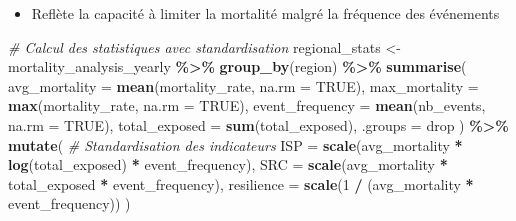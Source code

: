 \documentclass[
]{article}
\newenvironment{Shaded}{\begin{snugshade}}{\end{snugshade}}
\newcommand{\AttributeTok}[1]{\textcolor[rgb]{0.13,0.29,0.53}{#1}}
\newcommand{\CommentTok}[1]{\textcolor[rgb]{0.56,0.35,0.01}{\textit{#1}}}
\newcommand{\ConstantTok}[1]{\textcolor[rgb]{0.56,0.35,0.01}{#1}}
\newcommand{\DecValTok}[1]{\textcolor[rgb]{0.00,0.00,0.81}{#1}}
\newcommand{\FunctionTok}[1]{\textcolor[rgb]{0.13,0.29,0.53}{\textbf{#1}}}
\newcommand{\NormalTok}[1]{#1}
\newcommand{\OtherTok}[1]{\textcolor[rgb]{0.56,0.35,0.01}{#1}}
\newcommand{\SpecialCharTok}[1]{\textcolor[rgb]{0.81,0.36,0.00}{\textbf{#1}}}
\newcommand{\StringTok}[1]{\textcolor[rgb]{0.31,0.60,0.02}{#1}}
\providecommand{\tightlist}{%
  \setlength{\itemsep}{0pt}\setlength{\parskip}{0pt}}
\begin{document}
\begin{itemize}
\tightlist
\item
  Reflète la capacité à limiter la mortalité malgré la fréquence des
  événements
\end{itemize}

\begin{Shaded}
\begin{Highlighting}[]
\CommentTok{\# Calcul des statistiques avec standardisation}
\NormalTok{regional\_stats }\OtherTok{\textless{}{-}}\NormalTok{ mortality\_analysis\_yearly }\SpecialCharTok{\%\textgreater{}\%}
  \FunctionTok{group\_by}\NormalTok{(region) }\SpecialCharTok{\%\textgreater{}\%}
  \FunctionTok{summarise}\NormalTok{(}
    \AttributeTok{avg\_mortality =} \FunctionTok{mean}\NormalTok{(mortality\_rate, }\AttributeTok{na.rm =} \ConstantTok{TRUE}\NormalTok{),}
    \AttributeTok{max\_mortality =} \FunctionTok{max}\NormalTok{(mortality\_rate, }\AttributeTok{na.rm =} \ConstantTok{TRUE}\NormalTok{),}
    \AttributeTok{event\_frequency =} \FunctionTok{mean}\NormalTok{(nb\_events, }\AttributeTok{na.rm =} \ConstantTok{TRUE}\NormalTok{),}
    \AttributeTok{total\_exposed =} \FunctionTok{sum}\NormalTok{(total\_exposed),}
    \AttributeTok{.groups =} \StringTok{\textquotesingle{}drop\textquotesingle{}}
\NormalTok{  ) }\SpecialCharTok{\%\textgreater{}\%}
  \FunctionTok{mutate}\NormalTok{(}
    \CommentTok{\# Standardisation des indicateurs}
    \AttributeTok{ISP =} \FunctionTok{scale}\NormalTok{(avg\_mortality }\SpecialCharTok{*} \FunctionTok{log}\NormalTok{(total\_exposed) }\SpecialCharTok{*}\NormalTok{ event\_frequency),}
    \AttributeTok{SRC =} \FunctionTok{scale}\NormalTok{(avg\_mortality }\SpecialCharTok{*}\NormalTok{ total\_exposed }\SpecialCharTok{*}\NormalTok{ event\_frequency),}
    \AttributeTok{resilience =} \FunctionTok{scale}\NormalTok{(}\DecValTok{1} \SpecialCharTok{/}\NormalTok{ (avg\_mortality }\SpecialCharTok{*}\NormalTok{ event\_frequency))}
\NormalTok{  )}


\end{Highlighting}
\end{Shaded}
\end{document}
